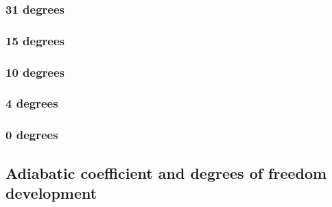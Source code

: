 \documentclass[../main.tex]{subfiles}
\begin{document}
        \subsubsection*{31 degrees}
            
            

        \subsubsection*{15 degrees}
            
            

        \subsubsection*{10 degrees}
            
            

        \subsubsection*{4 degrees}
            
            
        
        \subsubsection*{0 degrees}
            
            

    \subsection*{Adiabatic coefficient and degrees of freedom development}
        
        

        
        
\end{document}
